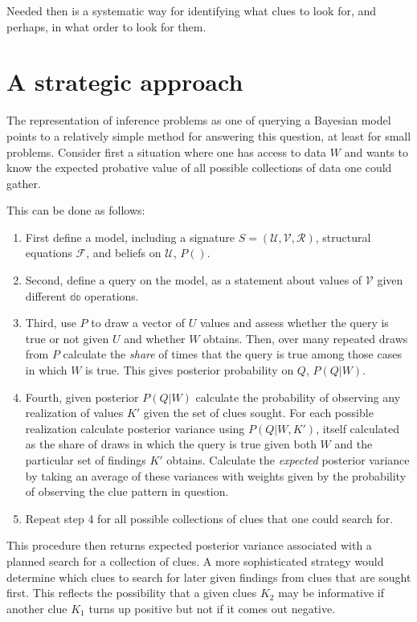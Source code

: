 \documentclass[12pt,]{book}
\providecommand{\tightlist}{%
  \setlength{\itemsep}{0pt}\setlength{\parskip}{0pt}}
\begin{document}
Needed then is a systematic way for identifying what clues to look for, and perhaps, in what order to look for them.

\hypertarget{a-strategic-approach}{%
\section{A strategic approach}\label{a-strategic-approach}}

The representation of inference problems as one of querying a Bayesian model points to a relatively simple method for answering this question, at least for small problems. Consider first a situation where one has access to data \(W\) and wants to know the expected probative value of all possible collections of data one could gather.

This can be done as follows:

\begin{enumerate}
\def\labelenumi{\arabic{enumi}.}
\tightlist
\item
  First define a model, including a signature \(S = (\mathcal{U}, \mathcal{V}, \mathcal{R})\), structural equations \(\mathcal{F}\), and beliefs on \(\mathcal{U}\), \(P()\).
\item
  Second, define a query on the model, as a statement about values of \(\mathcal{V}\) given different \(\mathbb{do}\) operations.
\item
  Third, use \(P\) to draw a vector of \(U\) values and assess whether the query is true or not given \(U\) and whether \(W\) obtains. Then, over many repeated draws from \(P\) calculate the \emph{share} of times that the query is true among those cases in which \(W\) is true. This gives posterior probability on \(Q\), \(P(Q|W)\).
\item
  Fourth, given posterior \(P(Q|W)\) calculate the probability of observing any realization of values \(K'\) given the set of clues sought. For each possible realization calculate posterior variance using \(P(Q|W, K')\), itself calculated as the share of draws in which the query is true given both \(W\) and the particular set of findings \(K'\) obtains. Calculate the \emph{expected} posterior variance by taking an average of these variances with weights given by the probability of observing the clue pattern in question.
\item
  Repeat step 4 for all possible collections of clues that one could search for.
\end{enumerate}

This procedure then returns expected posterior variance associated with a planned search for a collection of clues. A more sophisticated strategy would determine which clues to search for later given findings from clues that are sought first. This reflects the possibility that a given clues \(K_2\) may be informative if another clue \(K_1\) turns up positive but not if it comes out negative.
\end{document}
